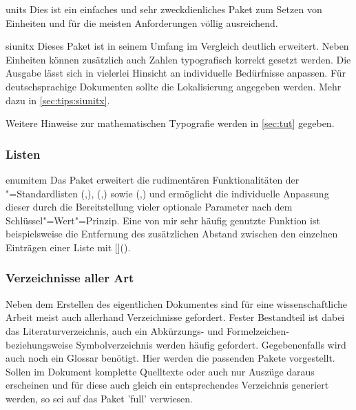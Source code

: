%
\begin{packages}
%
\item[units]
  Dies ist ein einfaches und sehr zweckdienliches Paket zum Setzen von 
  Einheiten und für die meisten Anforderungen völlig ausreichend.
\item[siunitx]
  Dieses Paket ist in seinem Umfang im Vergleich deutlich erweitert. Neben 
  Einheiten können zusätzlich auch Zahlen typografisch korrekt gesetzt werden. 
  Die Ausgabe lässt sich in vielerlei Hinsicht an individuelle Bedürfnisse 
  anpassen. Für deutschsprachige Dokumenten sollte die Lokalisierung angegeben 
  werden. Mehr dazu in \autoref{sec:tips:siunitx}.
%
\end{packages}
%
Weitere Hinweise zur mathematischen Typografie werden in \autoref{sec:tut} 
gegeben.
%


\subsubsection{Listen}
%
%
\begin{packages}
\item[enumitem]
  Das Paket  erweitert die rudimentären Funktionalitäten der 
  "=Standardlisten
  (,),
  (,) sowie
  (,) und
  ermöglicht die individuelle Anpassung dieser durch die Bereitstellung vieler 
  optionale Parameter nach dem Schlüssel"=Wert"=Prinzip. Eine von mir sehr 
  häufig genutzte Funktion ist beispielsweise die Entfernung des zusätzlichen 
  Abstand zwischen den einzelnen Einträgen einer Liste mit 
  []().
\end{packages}
%


\subsubsection{Verzeichnisse aller Art}
%
%
Neben dem Erstellen des eigentlichen Dokumentes sind für eine wissenschaftliche 
Arbeit meist auch allerhand Verzeichnisse gefordert. Fester Bestandteil ist 
dabei das Literaturverzeichnis, auch ein Abkürzungs- und Formelzeichen- 
beziehungsweise Symbolverzeichnis werden häufig gefordert. Gegebenenfalls wird 
auch noch ein Glossar benötigt. Hier werden die passenden Pakete vorgestellt. 
Sollen im Dokument komplette Quelltexte oder auch nur Auszüge daraus erscheinen 
und für diese auch gleich ein entsprechendes Verzeichnis generiert werden, so 
sei auf das Paket 'full' verwiesen.

